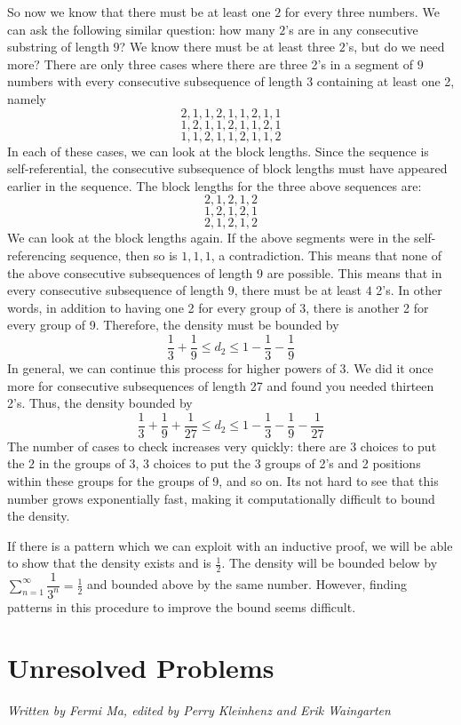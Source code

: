\documentclass[runningheads,a4paper]{llncs}
\begin{document}
So now we know that there must be at least one $2$ for every three numbers. We can ask  the following similar question: how many $2$'s are in any consecutive substring of length $9$? We know there must be at least three $2$'s, but do we need more? There are only three cases where there are three 2's in a segment of $9$ numbers with every consecutive subsequence of length 3 containing at least one 2, namely
\[ 2, 1, 1, 2, 1, 1 ,2 , 1, 1 \]
\[ 1, 2, 1, 1, 2, 1, 1, 2, 1 \]
\[ 1, 1, 2, 1, 1, 2, 1, 1, 2 \]
In each of these cases, we can look at the block lengths. Since the sequence is self-referential, the consecutive subsequence of block lengths must have appeared earlier in the sequence. The block lengths for the three above sequences are:
\[ 2, 1, 2, 1, 2 \]
\[ 1, 2, 1, 2, 1\]
\[ 2, 1, 2, 1, 2 \] 
We can look at the block lengths again. If the above segments were in the self-referencing sequence, then so is $1, 1, 1$, a contradiction. This means that none of the above consecutive subsequences of length 9 are possible. This means that in every consecutive subsequence of length $9$, there must be at least $4$ 2's. In other words, in addition to having one 2 for every group of 3, there is another 2 for every group of 9. Therefore, the density must be bounded by
\[ \dfrac{1}{3} + \dfrac{1}{9} \leq d_2 \leq 1 - \dfrac{1}{3} - \dfrac{1}{9} \]
In general, we can continue this process for higher powers of $3$. We did it once more for consecutive subsequences of length 27 and found you needed thirteen 2's. Thus, the density bounded by
\[ \dfrac{1}{3} + \dfrac{1}{9} + \dfrac{1}{27} \leq d_2 \leq 1 - \dfrac{1}{3} - \dfrac{1}{9} - \dfrac{1}{27} \]
The number of cases to check increases very quickly: there are $3$ choices to put the $2$ in the groups of $3$, $3$ choices to put the 3 groups of 2's and 2 positions within these groups for the groups of 9, and so on. Its not hard to see that this number grows exponentially fast, making it computationally difficult to bound the density.

If there is a pattern which we can exploit with an inductive proof, we will be able to show that the density exists and is $\frac{1}{2}$. The density will be bounded below by $\sum_{n=1}^\infty \dfrac{1}{3^n} = \frac{1}{2}$ and bounded above by the same number. However, finding patterns in this procedure to improve the bound seems difficult.

\section{Unresolved Problems}
\emph{Written by Fermi Ma, edited by Perry Kleinhenz and Erik Waingarten}
\end{document}
